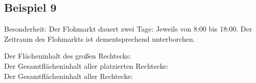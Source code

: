 \subsection{Beispiel 9}\label{ex:9}
Besonderheit: Der Flohmarkt dauert zwei Tage: Jeweils von 8:00 bis 18:00.
Der Zeitraum des Flohmarkts ist dementsprechend unterborchen.
\vspace{.4cm}

\noindent Der Flächeninhalt des großen Rechtecks: \\
Der Gesamtflächeninhalt aller platzierten Rechtecke: \\
Der Gesamtflächeninhalt aller Rechtecke: 